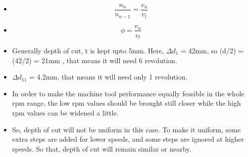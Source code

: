 \documentclass{article}
\begin{document}
\begin{itemize}
  \item $$\frac{n_n}{n_{n-1}} = \frac{v_u}{v_l}$$
  \item $$\phi = \frac{v_u}{v_l}$$
  \item Generally depth of cut, t is kept upto 5mm.  Here, $\Delta d_1$ = 42mm, so (d/2) = (42/2) = 21mm , that means it  will need 6 revolution. 
  \item  $\Delta d_11$ = 4.2mm, that means it  will need only 1 revolution.
  \item In order to make the machine tool performance equally feasible in the
  whole rpm range, the low rpm values should be brought still closer while
  the high rpm values can be widened a little.
  \item So, depth of cut will not be uniform in this case. To make it uniform, some extra steps are added for lower speeds, and some steps are ignored at higher speeds. So that, depth of cut will remain similar or nearby. 
\end{itemize}
\end{document}
